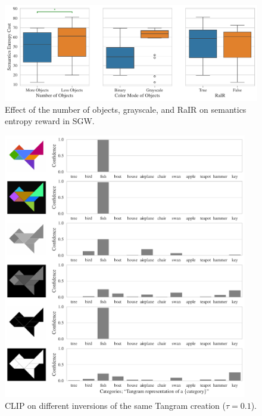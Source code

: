 
\begin{figure}[h]
    \centering
    \includegraphics[width=\textwidth]{images/nobj_mode_rair_sgw_boxplot.pdf}
    \caption{Effect of the number of objects, grayscale, and RaIR on semantics entropy reward in SGW.}
    \label{fig:nobj-mode-sgw}
\end{figure}

\begin{figure}[h]
    \centering
    \includegraphics[width=0.95\textwidth]{images/tangram_fish_10.pdf}
    \caption[CLIP on different inversions of the same Tangram creation.]{CLIP on different inversions of the same Tangram creation (\(\tau = 0.1\)).}
    \label{fig:clip-tangram-inversions}
\end{figure}


